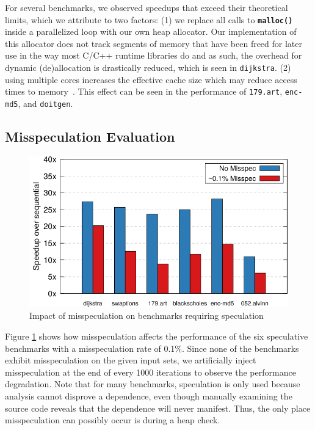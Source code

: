 For several benchmarks, we observed speedups that exceed their theoretical
limits, which we attribute to two factors:
(1) we replace all calls to \texttt{\textbf{malloc()}} inside a parallelized
loop with our own heap allocator. Our implementation of this allocator
does not track segments of memory that have been freed for later use in the
way most C/C++ runtime libraries do and as such, the overhead for dynamic
(de)allocation is drastically reduced, which is seen in \texttt{dijkstra}.
(2) using multiple cores increases the effective cache size which may
reduce access times to memory~\cite{jeon:11:oopsla}. This effect can be
seen in the performance of \texttt{179.art}, \texttt{enc-md5}, and
\texttt{doitgen}.

\subsection{Misspeculation Evaluation}
\begin{figure}[htp]
  \includegraphics[width=\columnwidth]{figures/misspec-crop}
  \caption{Impact of misspeculation on benchmarks requiring speculation}
  \label{fig:misspec}
\end{figure}
Figure \ref{fig:misspec} shows how misspeculation affects the
performance of the six speculative benchmarks with a misspeculation rate of
0.1\%. Since none of the benchmarks exhibit misspeculation on the
given input sets, we artificially inject misspeculation at the end of
every 1000 iterations to observe the performance degradation.
Note that for many benchmarks, speculation is only used
because analysis cannot disprove a dependence, even though manually
examining the source code reveals that the dependence will never manifest.
Thus, the only place misspeculation can possibly occur is during a heap
check.
